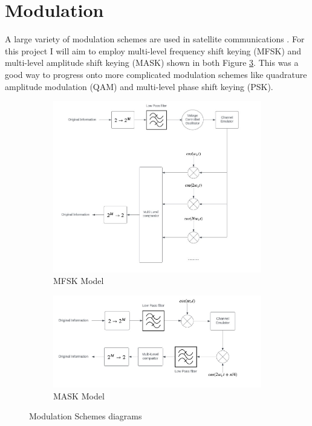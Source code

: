 \documentclass[conference]{IEEEtran}
\begin{document}
\section{Modulation}
A large variety of modulation schemes are used in satellite communications \cite{smith_modulation_2017}. For this project I will aim to employ multi-level frequency shift keying (MFSK) and multi-level amplitude shift keying (MASK) shown in both Figure \ref{fig:Moduluation_models}. This was a good way to progress onto more complicated modulation schemes like quadrature amplitude modulation (QAM) and multi-level phase shift keying (PSK).
\begin{figure}[h]
\centering
\begin{subfigure}{0.5\textwidth}
	\centering
	\includegraphics[width=\textwidth]{MFSK_model.png}
	\caption{MFSK Model}
	\label{fig:MFSK_model}
\end{subfigure}
\centering
\begin{subfigure}{0.5\textwidth}
	\centering
	\includegraphics[width=\textwidth]{MASK_model.png}
	\caption{MASK Model}
	\label{fig:MASK_model}
\end{subfigure}
\caption{Modulation Schemes diagrams}
\label{fig:Moduluation_models}
\end{figure}
\label{sec:Modulation}
\end{document}
